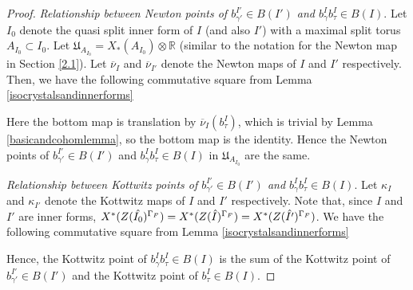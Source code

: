 \documentclass[11pt,a4paper]{article}
\theoremstyle{definition}
\theoremstyle{plain}
\theoremstyle{remark}
\theoremstyle{plain}
\begin{document}
\begin{proof}
    \textit{Relationship between Newton points of $b_{\gamma'}^{I'} \in B(I')$ and $b_{\gamma}^Ib_{\tau}^I \in B(I)$}. Let $I_0$ denote the quasi split inner form of $I$ (and also $I'$) with a maximal split torus $A_{I_0} \subset I_0$. Let $\mathfrak{U}_{A_{I_0}} = X_*(A_{I_0}) \otimes \mathbb{R}$ (similar to the notation for the Newton map in Section \ref{2.1}). Let $\overline{\nu}_I$ and $\overline{\nu}_{I'}$ denote the Newton maps of $I$ and $I'$ respectively. Then, we have the following commutative square from Lemma \ref{isocrystalsandinnerforms}
    \begin{center}
    \end{center}
    Here the bottom map is translation by $\overline{\nu}_I(b_{\tau}^I)$, which is trivial by Lemma \ref{basicandcohomlemma}, so the bottom map is the identity. Hence the Newton points of $b_{\gamma'}^{I'} \in B(I')$ and $b_{\gamma}^I b_{\tau}^I \in B(I)$ in $\mathfrak{U}_{A_{I_0}}$ are the same.

    \textit{Relationship between Kottwitz points of $b_{\gamma'}^{I'} \in B(I')$ and $b_{\gamma}^I b_{\tau}^I \in B(I)$}.
    Let $\kappa_I$ and $\kappa_{I'}$ denote the Kottwitz maps of $I$ and $I'$ respectively. Note that, since $I$ and $I'$ are inner forms, $X^*(Z(\Hat{I_0})^{\Gamma_F}) = X^*(Z(\Hat{I})^{\Gamma_F}) = X^*(Z(\Hat{I'})^{\Gamma_F})$. We have the following commutative square from Lemma \ref{isocrystalsandinnerforms}
    \begin{center}
    \end{center}
    Hence, the Kottwitz point of $b_{\gamma}^I b_{\tau}^I \in B(I)$ is the sum of the Kottwitz point of $b_{\gamma'}^{I'} \in B(I')$ and the Kottwitz point of $b_{\tau}^{I} \in B(I)$.
    

\end{proof}
\end{document}
